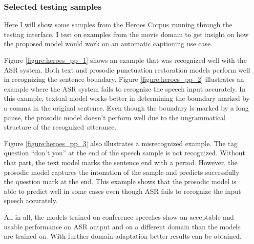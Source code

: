 \subsubsection{Selected testing samples}
Here I will show some samples from the Heroes Corpus running through the testing interface. I test on examples from the movie domain to get insight on how the proposed model would work on an automatic captioning use case. 

Figure \ref{figure:heroes_pp_1} shows an example that was recognized well with the ASR system. Both text and prosodic punctuation restoration models perform well in recognizing the sentence boundary. Figure \ref{figure:heroes_pp_2} illustrates an example where the ASR system fails to recognize the speech input accurately. In this example, textual model works better in determining the boundary marked by a comma in the original sentence. Even though the boundary is marked by a long pause, the prosodic model doesn't perform well due to the ungrammatical structure of the recognized utterance. 

Figure \ref{figure:heroes_pp_3} also illustrates a misrecognized example. The tag question ``don't you'' at the end of the speech sample is not recognized. Without that part, the text model marks the sentence end with a period. However, the prosodic model captures the intonation of the sample and predicts successfully the question mark at the end. This example shows that the prosodic model is able to predict well in some cases even though ASR fails to recognize the input speech accurately. 

All in all, the models trained on conference speeches show an acceptable and usable performance on ASR output and on a different domain than the models are trained on. With further domain adaptation better results can be obtained. 

